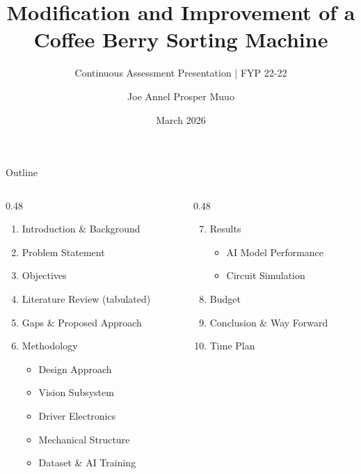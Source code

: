 \documentclass[aspectratio=169, 11pt]{beamer}
\title{Modification and Improvement of a\\Coffee Berry Sorting Machine}
\subtitle{Continuous Assessment Presentation \quad | \quad FYP 22-22}
\author{Joe Annel \quad Prosper Muuo}
\institute{Dept.\ of Mechatronic Engineering, JKUAT \\ Supervisor: Dr.\ Maureen Andanje}
\date{March 2026}
\begin{document}
\begin{frame}[plain]
\maketitle
\end{frame}

\begin{frame}{Outline}
\setlength{\leftmargini}{1.2em}
\begin{columns}[T]
  \begin{column}{0.48\textwidth}
    \begin{enumerate}
      \item Introduction \& Background
      \item Problem Statement
      \item Objectives
      \item Literature Review (tabulated)
      \item Gaps \& Proposed Approach
      \item Methodology
        \begin{itemize}\small
          \item Design Approach
          \item Vision Subsystem
          \item Driver Electronics
          \item Mechanical Structure
          \item Dataset \& AI Training
        \end{itemize}
    \end{enumerate}
  \end{column}
  \begin{column}{0.48\textwidth}
    \begin{enumerate}\setcounter{enumi}{6}
      \item Results
        \begin{itemize}\small
          \item AI Model Performance
          \item Circuit Simulation
        \end{itemize}
      \item Budget
      \item Conclusion \& Way Forward
      \item Time Plan
    \end{enumerate}
  \end{column}
\end{columns}
\end{frame}
\end{document}
